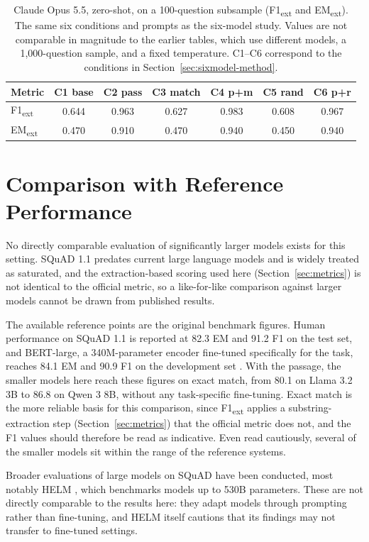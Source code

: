 \documentclass[master]{thesis}
\newcommand{\sref}[1]{Section~\ref{#1}}  %
\begin{document}
\begin{table}[h]
\centering
\begin{tabular}{lcccccc}
\toprule
Metric & C1 base & C2 pass & C3 match & C4 p+m & C5 rand & C6 p+r \\
\midrule
F1\textsubscript{ext} & 0.644 & 0.963 & 0.627 & 0.983 & 0.608 & 0.967 \\
EM\textsubscript{ext} & 0.470 & 0.910 & 0.470 & 0.940 & 0.450 & 0.940 \\
\bottomrule
\end{tabular}
\caption{Claude Opus 5.5, zero-shot, on a 100-question subsample (F1\textsubscript{ext} and EM\textsubscript{ext}). The same six conditions and prompts as the six-model study. Values are not comparable in magnitude to the earlier tables, which use different models, a 1,000-question sample, and a fixed temperature. C1--C6 correspond to the conditions in \sref{sec:sixmodel-method}.}
\label{tab:frontier}
\end{table}

\section{Comparison with Reference Performance}

No directly comparable evaluation of significantly larger models exists for this setting. SQuAD 1.1 predates current large language models and is widely treated as saturated, and the extraction-based scoring used here (\sref{sec:metrics}) is not identical to the official metric, so a like-for-like comparison against larger models cannot be drawn from published results.

The available reference points are the original benchmark figures. Human performance on SQuAD 1.1 is reported at 82.3 EM and 91.2 F1 on the test set, and BERT-large, a 340M-parameter encoder fine-tuned specifically for the task, reaches 84.1 EM and 90.9 F1 on the development set \cite{devlin2019bert}. With the passage, the smaller models here reach these figures on exact match, from 80.1 on Llama 3.2 3B to 86.8 on Qwen 3 8B, without any task-specific fine-tuning. Exact match is the more reliable basis for this comparison, since F1\textsubscript{ext} applies a substring-extraction step (\sref{sec:metrics}) that the official metric does not, and the F1 values should therefore be read as indicative. Even read cautiously, several of the smaller models sit within the range of the reference systems.

Broader evaluations of large models on SQuAD have been conducted, most notably HELM \cite{liang2022helm}, which benchmarks models up to 530B parameters. These are not directly comparable to the results here: they adapt models through prompting rather than fine-tuning, and HELM itself cautions that its findings may not transfer to fine-tuned settings.
\end{document}
